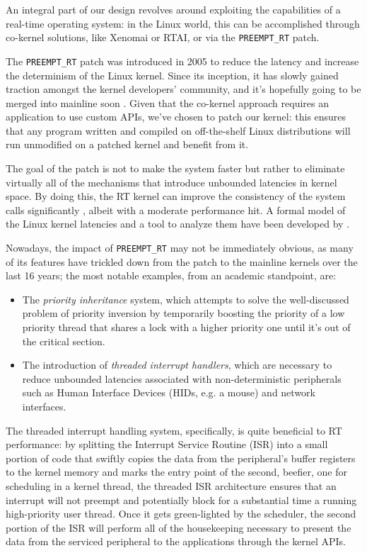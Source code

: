 \documentclass[a4paper,12pt]{report}
\begin{document}
An integral part of our design revolves around exploiting the capabilities of a real-time operating system: in the Linux world, this can be accomplished through co-kernel solutions, like Xenomai or RTAI, or via the \texttt{PREEMPT\_RT} patch.

The \texttt{PREEMPT\_RT} patch was introduced in 2005 to reduce the latency and increase the determinism of the Linux kernel. Since its inception, it has slowly gained traction amongst the kernel developers' community, and it's hopefully going to be merged into mainline soon \cite{lwn-rt-future}. Given that the co-kernel approach requires an application to use custom APIs, we've chosen to patch our kernel: this ensures that any program written and compiled on off-the-shelf Linux distributions will run unmodified on a patched kernel and benefit from it.

The goal of the patch is not to make the system faster but rather to eliminate virtually all of the mechanisms that introduce unbounded latencies in kernel space. By doing this, the RT kernel can improve the consistency of the system calls significantly \cite{dmoceri-benchmarking-rtlinux}, albeit with a moderate performance hit. A formal model of the Linux kernel latencies and a tool to analyze them have been developed by \textcite{demistifying-rt-latency}.

Nowadays, the impact of \texttt{PREEMPT\_RT} may not be immediately obvious, as many of its features have trickled down from the patch to the mainline kernels over the last 16 years; the most notable examples, from an academic standpoint, are:

\begin{itemize}
    \item The \textit{priority inheritance} system, which attempts to solve the well-discussed \cite{buttazzo-hard-rt} problem of priority inversion by temporarily boosting the priority of a low priority thread that shares a lock with a higher priority one until it's out of the critical section.
    \item The introduction of \textit{threaded interrupt handlers}, which are necessary to reduce unbounded latencies associated with non-deterministic peripherals such as Human Interface Devices (HIDs, e.g. a mouse) and network interfaces.
\end{itemize}

The threaded interrupt handling system, specifically, is quite beneficial to RT performance: by splitting the Interrupt Service Routine (ISR) into a small portion of code that swiftly copies the data from the peripheral's buffer registers to the kernel memory and marks the entry point of the second, beefier, one for scheduling in a kernel thread, the threaded ISR architecture ensures that an interrupt will not preempt and potentially block for a substantial time a running high-priority user thread. Once it gets green-lighted by the scheduler, the second portion of the ISR will perform all of the housekeeping necessary to present the data from the serviced peripheral to the applications through the kernel APIs.
\end{document}
